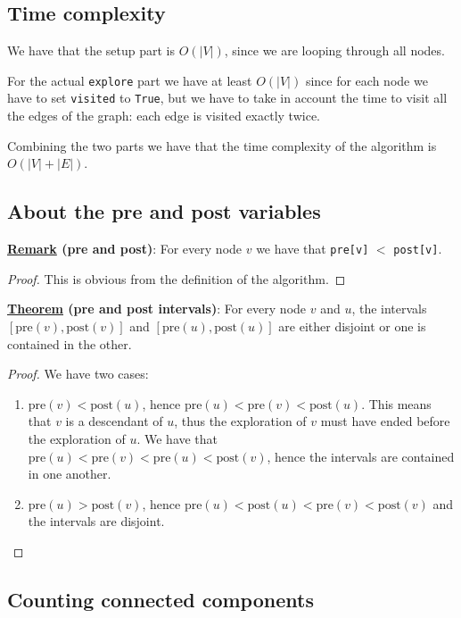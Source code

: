 \documentclass[12pt]{extarticle}
\begin{document}
\subsection{Time complexity}

We have that the setup part is $O(|V|)$, since we are looping through all nodes.

For the actual \texttt{explore} part we have at least $O(|V|)$ since for each node we have to set \texttt{visited} to \texttt{True},
but we have to take in account the time to visit all the edges of the graph:
each edge is visited exactly twice.

Combining the two parts we have that the time complexity of the algorithm is $O(|V| + |E|)$.

\subsection{About the pre and post variables}

\textbf{\underline{Remark} (pre and post)}:
For every node $v$ we have that \texttt{pre[v]} $<$ \texttt{post[v]}.

\begin{proof}
    This is obvious from the definition of the algorithm.
\end{proof}

\textbf{\underline{Theorem} (pre and post intervals)}:
For every node $v$ and $u$, the intervals $[\text{pre}(v), \text{post}(v)]$ and $[\text{pre}(u), \text{post}(u)]$ are either disjoint or one is contained in the other.

\begin{proof}
    We have two cases:
    \begin{enumerate}
        \item $\text{pre}(v) < \text{post}(u)$, hence $\text{pre}(u) < \text{pre}(v) < \text{post}(u)$. This means that $v$ is a descendant of $u$, thus the exploration of $v$ must have ended before the exploration of $u$.
              We have that $\text{pre}(u) < \text{pre}(v) < \text{pre}(u) < \text{post}(v)$, hence the intervals are contained in one another.
        \item $\text{pre}(u) > \text{post}(v)$, hence $\text{pre}(u) < \text{post}(u) < \text{pre}(v) < \text{post}(v)$ and the intervals are disjoint.
    \end{enumerate}
\end{proof}

\subsection{Counting connected components}
\end{document}
